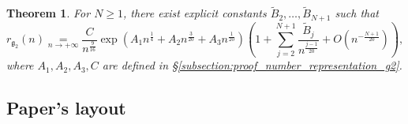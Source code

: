 \documentclass[a4paper]{amsart}
\newtheorem{maintheorem}{Theorem}
\theoremstyle{remark}
\theoremstyle{definition}
\begin{document}
\begin{maintheorem}
\label{th:representation_g_2}
For $N \geq 1$, there exist explicit constants $\widetilde{B}_2,\ldots,\widetilde{B}_{N+1}$ such that
$$ r_{\mathfrak{g}_2}(n) \underset{n \to +\infty}{=} \frac{C}{n^{\frac{9}{16}}} \exp \left( A_1 n^{\frac{1}{4}}+ A_2 n^{\frac{3}{20}}+ A_3 n^{\frac{1}{20}} \right) \left( 1+ \sum_{j=2}^{N+1} \frac{\widetilde{B}_j}{n^{\frac{j-1}{20}}} + O \left( n^{-\frac{N+1}{20}} \right)\right), $$
where $A_1,A_2,A_3,C$ are defined in §\ref{subsection:proof_number_representation_g2}.
\end{maintheorem}

\subsection{Paper's layout}
\end{document}

